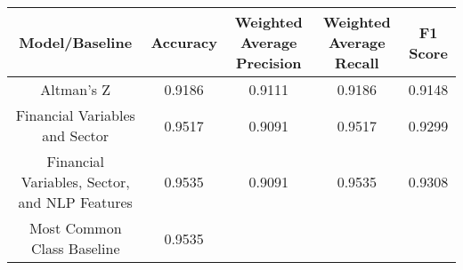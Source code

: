 \footnotesize
\begin{tabular}{ccccc}
\toprule
Model/Baseline & Accuracy & Weighted Average Precision & Weighted Average Recall & F1 Score \\
\midrule
Altman's Z & 0.9186 & 0.9111 & 0.9186 & 0.9148 \\
Financial Variables and Sector & 0.9517 & 0.9091 & 0.9517 & 0.9299 \\
Financial Variables, Sector, and NLP Features & 0.9535 & 0.9091 & 0.9535 & 0.9308 \\
Most Common Class Baseline & 0.9535 &  &  &  \\
\bottomrule
\end{tabular}

\normalsize